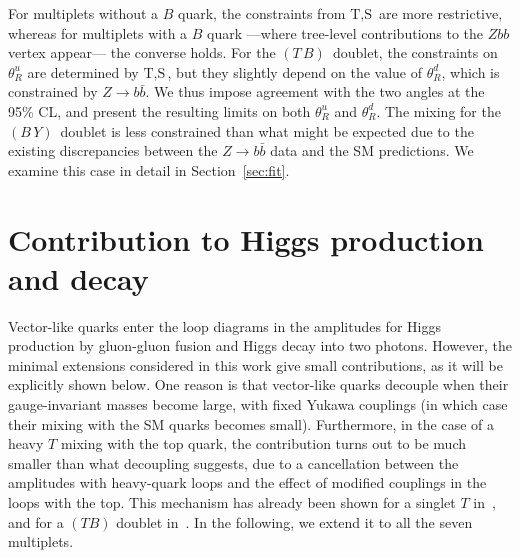 \documentclass[12pt,a4paper]{article}
\newcommand{\tb}{$(T\,B)$}
\newcommand{\by}{$(B\,Y)$}
\begin{document}
For multiplets without a $B$ quark, the constraints from $\text{T},\text{S}$ are more restrictive, whereas for multiplets with a $B$ quark ---where tree-level contributions to the $Zbb$ vertex appear--- the converse holds. For the \tb\ doublet, the constraints on $\theta_R^u$ are determined by $\text{T},\text{S}$, but they slightly depend on the value of $\theta_R^d$, which is constrained by $Z \to b \bar b$. We thus impose agreement with the two angles at the 95\% CL, and present the resulting limits on both $\theta_R^u$ and $\theta_R^d$. The mixing for the \by\ doublet is less constrained than what might be expected due to the existing discrepancies between the $Z\to b \bar b$ data and the SM predictions. We examine this case in detail in Section~\ref{sec:fit}.


\section{Contribution to Higgs production and decay}
\label{sec:higgs}

Vector-like quarks enter the loop diagrams in the amplitudes for Higgs production by gluon-gluon fusion and Higgs decay into two photons. However, the minimal extensions considered in this work give small contributions, as it will be explicitly shown below. One reason is that vector-like quarks decouple when their gauge-invariant masses become large, with fixed Yukawa couplings (in which case their mixing with the SM quarks becomes small). Furthermore, in the case of a heavy $T$ mixing with the top quark, the contribution turns out to be much smaller than what decoupling suggests, due to a cancellation between the amplitudes with heavy-quark loops and the effect of modified couplings in the loops with the top. This mechanism has already been shown for a singlet $T$ in~\cite{AguilarSaavedra:2006gw}, and for a $(TB)$ doublet in~\cite{Dawson:2012di}. In the following, we extend it to all the seven multiplets.
\end{document}
